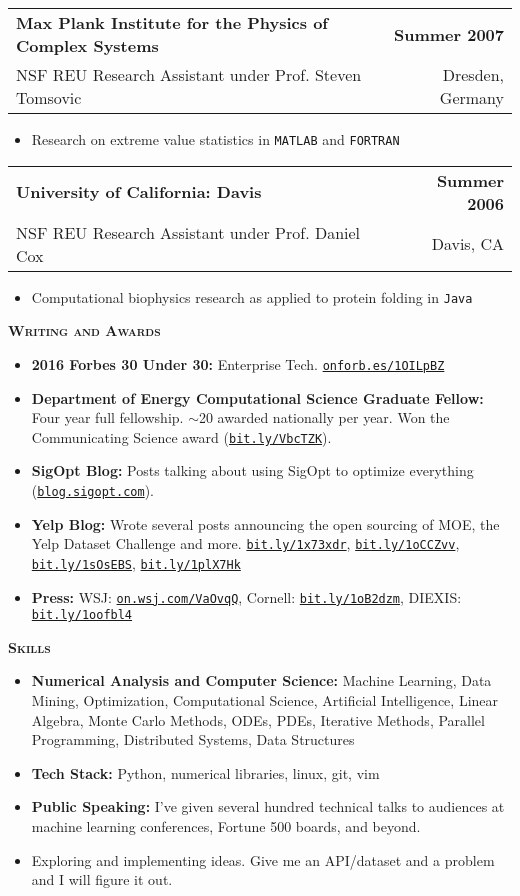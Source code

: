 \documentclass[letterpaper, 11pt]{article}
\makeatletter
\renewcommand{\section}[1]{%
  \begin{tcolorbox}
    \textsc{\textbf{\large{#1}}}
  \end{tcolorbox}
}
\newcommand{\entry}[4]{%
  \begin{tabularx}{\linewidth}{@{}Xr@{}}
    \textbf{#1} & \textbf{#4} \\
    #3          & #2          \\
  \end{tabularx}
}
\newcommand{\website}[1]{\href{http://#1}{\texttt{#1}}}
\makeatother
\begin{document}
  \entry{Max Plank Institute for the Physics of Complex Systems}{Dresden, Germany}{NSF REU Research Assistant under Prof. Steven Tomsovic}{Summer 2007}
  \begin{itemize}
    \item{Research on extreme value statistics in \texttt{MATLAB} and \texttt{FORTRAN}}
  \end{itemize}

  \entry{University of California: Davis}{Davis, CA}{NSF REU Research Assistant under Prof. Daniel Cox}{Summer 2006}
  \begin{itemize}
    \item{Computational biophysics research as applied to protein folding in \texttt{Java}}
  \end{itemize}

  \section{Writing and Awards}

  \begin{itemize}
    \item {\bf 2016 Forbes 30 Under 30:} Enterprise Tech. \website{onforb.es/1OILpBZ}
    \item {\bf Department of Energy Computational Science Graduate Fellow:} Four year full fellowship. $\sim$20 awarded nationally per year. Won the Communicating Science award (\website{bit.ly/VbcTZK}).
    \item {\bf SigOpt Blog:} Posts talking about using SigOpt to optimize everything (\website{blog.sigopt.com}).
    \item {\bf Yelp Blog:} Wrote several posts announcing the open sourcing of MOE, the Yelp Dataset Challenge and more. \website{bit.ly/1x73xdr}, \website{bit.ly/1oCCZvv}, \website{bit.ly/1sOsEBS}, \website{bit.ly/1plX7Hk}
    \item {\bf Press:} WSJ: \website{on.wsj.com/VaOvqQ}, Cornell: \website{bit.ly/1oB2dzm},  DIEXIS: \website{bit.ly/1oofbl4}
  \end{itemize}

  \section{Skills}

  \begin{itemize}
    \item {\bf Numerical Analysis and Computer Science:} Machine Learning, Data Mining, Optimization, Computational Science, Artificial Intelligence, Linear Algebra, Monte Carlo Methods, ODEs, PDEs, Iterative Methods, Parallel Programming, Distributed Systems, Data Structures
    \item {\bf Tech Stack:} Python, numerical libraries, linux, git, vim
    \item {\bf Public Speaking:} I've given several hundred technical talks to audiences at machine learning conferences, Fortune 500 boards, and beyond.
    \item Exploring and implementing ideas. Give me an API/dataset and a problem and I will figure it out.
  \end{itemize}
\end{document}
